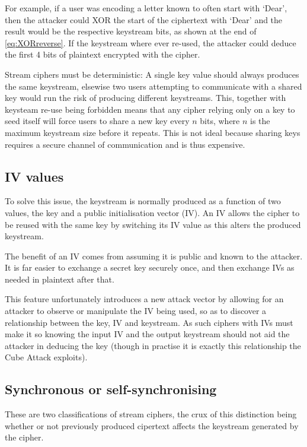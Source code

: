 \documentclass{report}
\let\Oldsubsection\subsection
\renewcommand{\subsection}{\FloatBarrier\Oldsubsection}
\begin{document}
For example, if a user was encoding a letter known to often start with `Dear', then the attacker could XOR the start of the ciphertext with `Dear' and the result would be the respective keystream bits, as shown at the end of \ref{eq:XORreverse}. If the keystream where ever re-used, the attacker could deduce the first 4 bits of plaintext encrypted with the cipher.

Stream ciphers must be deterministic: A single key value should always produces the same keystream, elsewise two users attempting to communicate with a shared key would run the risk of producing different keystreams. This, together with keysteam re-use being forbidden means that any cipher relying only on a key to seed itself will force users to share a new key every $n$ bits, where $n$ is the maximum keystream size before it repeats. This is not ideal because sharing keys requires a secure channel of communication and is thus expensive.

\subsection*{IV values}
To solve this issue, the keystream is normally produced as a function of two values, the key and a public initialisation vector (IV). An IV allows the cipher to be reused with the same key by switching its IV value as this alters the produced keystream.

The benefit of an IV comes from assuming it is public and known to the attacker. It is far easier to exchange a secret key securely once, and then exchange IVs as needed in plaintext after that.

This feature unfortunately introduces a new attack vector by allowing for an attacker to observe or manipulate the IV being used, so as to discover a relationship between the key, IV and keystream. As such ciphers with IVs must make it so knowing the input IV and the output keystream should not aid the attacker in deducing the key (though in practise it is exactly this relationship the Cube Attack exploits).

\subsection{Synchronous or self-synchronising}
These are two classifications of stream ciphers, the crux of this distinction being whether or not previously produced cipertext affects the keystream generated by the cipher\cite{selfSyncCipher}.
\end{document}
